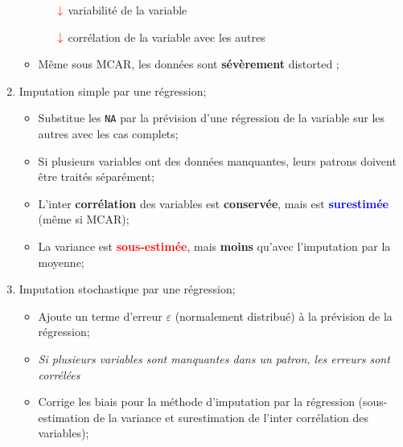 \documentclass[10pt, french]{article}
\begin{document}
\begin{multicols*}{3}
\begin{enumerate}[leftmargin = *]
\begin{itemize}[leftmargin = *]
\begin{itemize}[leftmargin = *]
			\item[$\color{red}\downarrow$]	variabilité de la variable	\\
			\item[$\color{red}\downarrow$]	corrélation de la variable avec les autres	\\
			\end{itemize}
		\item	Même sous MCAR, les données sont \textbf{sévèrement} \og distorted \fg{};
		\end{itemize}
	\item	Imputation simple par une régression;
		\begin{itemize}[leftmargin = *]
		\item	Substitue les \texttt{NA} par la prévision d'une régression de la variable sur les autres avec les cas complets;
		\item	Si plusieurs variables ont des données manquantes, leurs patrons doivent être traités séparément;
		\item	L'inter \textbf{corrélation} des variables est \textbf{conservée}, mais est \textcolor{blue}{\textbf{surestimée}} (même si MCAR);
		\item	La variance est \textcolor{red}{\textbf{sous-estimée}}, mais \textbf{moins} qu'avec l'imputation par la moyenne;
		\end{itemize}
	\item	Imputation stochastique par une régression;
		\begin{itemize}[leftmargin = *]
		\item	Ajoute un terme d'erreur $\varepsilon$ (normalement distribué) à la prévision de la régression;
		\item	\textit{Si plusieurs variables sont manquantes dans un patron, les erreurs sont corrélées}
		\item	Corrige les biais pour la méthode d'imputation par la régression (sous-estimation de la variance et surestimation de l'inter corrélation des variables);

\end{itemize}
\end{enumerate}
\end{multicols*}
\end{document}
